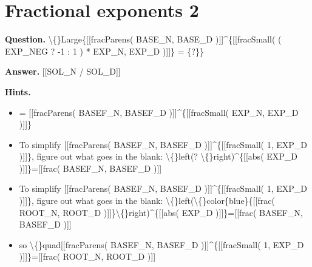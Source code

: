 \documentclass{article}
\begin{document}
\section*{Fractional exponents 2}
\textbf{Question.} \textbackslash\{\}Large\{[[fracParens( BASE\_N, BASE\_D )]]\textasciicircum{}\{[[fracSmall( ( EXP\_NEG ? -1 : 1 ) * EXP\_N, EXP\_D )]]\} = \{?\}\}

\textbf{Answer.} [[SOL\_N / SOL\_D]]

\textbf{Hints.}
\begin{itemize}
  \item = [[fracParens( BASEF\_N, BASEF\_D )]]\textasciicircum{}\{[[fracSmall( EXP\_N, EXP\_D )]]\}
  \item To simplify [[fracParens( BASEF\_N, BASEF\_D )]]\textasciicircum{}\{[[fracSmall( 1, EXP\_D )]]\}, figure out what goes in the blank: \textbackslash\{\}left(? \textbackslash\{\}right)\textasciicircum{}\{[[abs( EXP\_D )]]\}=[[frac( BASEF\_N, BASEF\_D )]]
  \item To simplify [[fracParens( BASEF\_N, BASEF\_D )]]\textasciicircum{}\{[[fracSmall( 1, EXP\_D )]]\}, figure out what goes in the blank: \textbackslash\{\}left(\textbackslash\{\}color\{blue\}\{[[frac( ROOT\_N, ROOT\_D )]]\}\textbackslash\{\}right)\textasciicircum{}\{[[abs( EXP\_D )]]\}=[[frac( BASEF\_N, BASEF\_D )]]
  \item so \textbackslash\{\}quad[[fracParens( BASEF\_N, BASEF\_D )]]\textasciicircum{}\{[[fracSmall( 1, EXP\_D )]]\}=[[frac( ROOT\_N, ROOT\_D )]]
\end{itemize}
\end{document}
